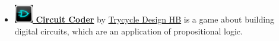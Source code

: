 \begin{itemize}
\item
\href{http://itunes.apple.com/at/app/circuit-coder/id492180472?mt=8}{\bf 
\includegraphics[width=0.8cm]{related/CircuitCoder.png} Circuit Coder} 
by 
\href{http://sweyla.com/}{Trycycle Design HB} is a game about building digital circuits,
which are an application of propositional logic.

\end{itemize}
